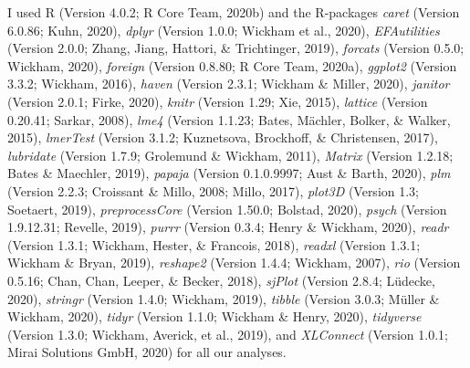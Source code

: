 \documentclass[
  english,
  man]{apa6}
\begin{document}
I used R (Version 4.0.2; R Core Team, 2020b) and the R-packages \emph{caret} (Version 6.0.86; Kuhn, 2020), \emph{dplyr} (Version 1.0.0; Wickham et al., 2020), \emph{EFAutilities} (Version 2.0.0; Zhang, Jiang, Hattori, \& Trichtinger, 2019), \emph{forcats} (Version 0.5.0; Wickham, 2020), \emph{foreign} (Version 0.8.80; R Core Team, 2020a), \emph{ggplot2} (Version 3.3.2; Wickham, 2016), \emph{haven} (Version 2.3.1; Wickham \& Miller, 2020), \emph{janitor} (Version 2.0.1; Firke, 2020), \emph{knitr} (Version 1.29; Xie, 2015), \emph{lattice} (Version 0.20.41; Sarkar, 2008), \emph{lme4} (Version 1.1.23; Bates, Mächler, Bolker, \& Walker, 2015), \emph{lmerTest} (Version 3.1.2; Kuznetsova, Brockhoff, \& Christensen, 2017), \emph{lubridate} (Version 1.7.9; Grolemund \& Wickham, 2011), \emph{Matrix} (Version 1.2.18; Bates \& Maechler, 2019), \emph{papaja} (Version 0.1.0.9997; Aust \& Barth, 2020), \emph{plm} (Version 2.2.3; Croissant \& Millo, 2008; Millo, 2017), \emph{plot3D} (Version 1.3; Soetaert, 2019), \emph{preprocessCore} (Version 1.50.0; Bolstad, 2020), \emph{psych} (Version 1.9.12.31; Revelle, 2019), \emph{purrr} (Version 0.3.4; Henry \& Wickham, 2020), \emph{readr} (Version 1.3.1; Wickham, Hester, \& Francois, 2018), \emph{readxl} (Version 1.3.1; Wickham \& Bryan, 2019), \emph{reshape2} (Version 1.4.4; Wickham, 2007), \emph{rio} (Version 0.5.16; Chan, Chan, Leeper, \& Becker, 2018), \emph{sjPlot} (Version 2.8.4; Lüdecke, 2020), \emph{stringr} (Version 1.4.0; Wickham, 2019), \emph{tibble} (Version 3.0.3; Müller \& Wickham, 2020), \emph{tidyr} (Version 1.1.0; Wickham \& Henry, 2020), \emph{tidyverse} (Version 1.3.0; Wickham, Averick, et al., 2019), and \emph{XLConnect} (Version 1.0.1; Mirai Solutions GmbH, 2020) for all our analyses.
\end{document}

